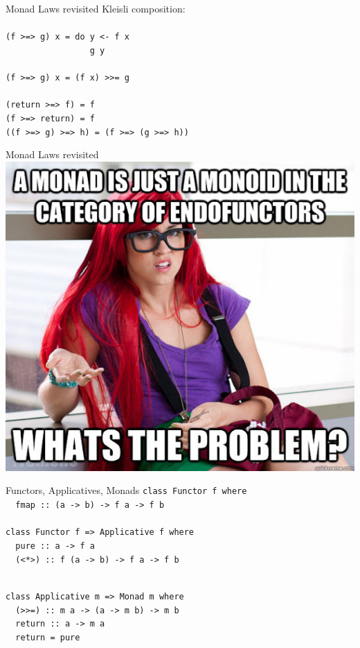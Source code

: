 \documentclass{beamer}
\begin{document}
\begin{frame}{Monad Laws revisited}
  Kleisli composition: \\ \pause
  \ \\
  \texttt{(f >=> g) x = do y <- f x \\
    \ \ \ \ \ \ \ \ \ \ \ \ \ \ \ \ \ g y} \\ \pause
  \ \\ 
  \texttt{(f >=> g) x = (f x) >>= g} \\ \pause
  \ \\
  \texttt{(return >=> f) = f} \\ \pause
  \texttt{(f >=> return) = f} \\ \pause
  \texttt{((f >=> g) >=> h) = (f >=> (g >=> h))}
\end{frame}

\begin{frame}{Monad Laws revisited}
  \includegraphics[width=\textwidth]{monoids.jpg}  
\end{frame}

\begin{frame}{Functors, Applicatives, Monads}\pause
  \texttt{class Functor f where\\
    \ \ fmap :: (a -> b) -> f a -> f b}\\
  \ \\ \pause
  \texttt{class Functor f => Applicative f where\\
    \ \ pure  :: a -> f a\\
    \ \ (<*>) :: f (a -> b) -> f a -> f b}\\
  \ \\ \pause

  \texttt{class Applicative m => Monad m where\\
    \ \ (>>=) :: m a -> (a -> m b) -> m b\\
    \ \ return :: a -> m a\\
    \ \ return = pure}
\end{frame}
\end{document}
